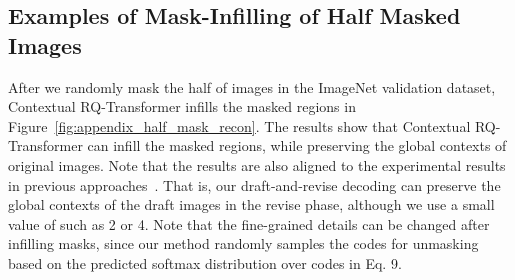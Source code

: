 \documentclass{article}
\begin{document}
\subsection{Examples of Mask-Infilling of Half Masked Images}
After we randomly mask the half of images in the ImageNet validation dataset, Contextual RQ-Transformer infills the masked regions in Figure~\ref{fig:appendix_half_mask_recon}.
The results show that Contextual RQ-Transformer can infill the masked regions, while preserving the global contexts of original images.
Note that the results are also aligned to the experimental results in previous approaches~\cite{MAE,MaskGIT}.
That is, our draft-and-revise decoding can preserve the global contexts of the draft images in the revise phase, although we use a small value of  such as 2 or 4.
Note that the fine-grained details can be changed after infilling masks, since our method randomly samples the codes for unmasking based on the predicted softmax distribution over codes in Eq. 9.
\end{document}
